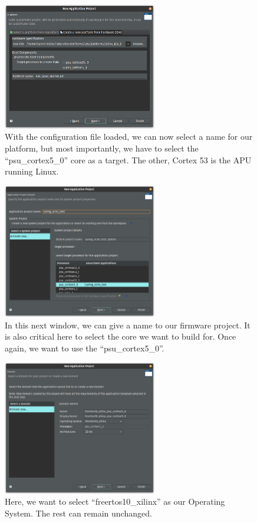\documentclass[10pt]{article}
\begin{document}
\begin{figure}[H]
  \centering
  \includegraphics[width=0.6\textwidth]{./img/vitis_new/project4}
  \caption{With the configuration file loaded, we can now select a name for our platform, but most importantly, we have to select the ``psu\_cortex5\_0'' core
    as a target. The other, Cortex 53 is the APU running Linux.}
\end{figure}

\begin{figure}[H]
  \centering
  \includegraphics[width=0.6\textwidth]{./img/vitis_new/project5}
  \caption{In this next window, we can give a name to our firmware project. It is also critical here to select the core we want to build for.
    Once again, we want to use the ``psu\_cortex5\_0''.}
\end{figure}

\begin{figure}[H]
  \centering
  \includegraphics[width=0.6\textwidth]{./img/vitis_new/project6}
  \caption{Here, we want to select ``freertos10\_xilinx'' as our Operating System. The rest can remain unchanged.}
\end{figure}
\end{document}
